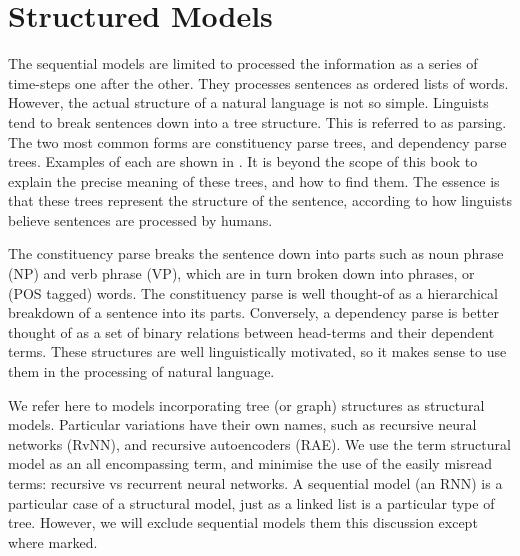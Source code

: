 \documentclass[12pt,parskip]{komatufte}
\begin{document}
\section{Structured Models}


The sequential models are limited to processed the information as a series of time-steps one after the other.
They processes sentences as ordered lists of words.
However, the actual structure of a natural language is not so simple.
Linguists tend to break sentences down into a tree structure.
This is referred to as parsing.
The two most common forms are constituency parse trees, and dependency parse trees.
Examples of each are shown in .
It is beyond the scope of this book to explain the precise meaning of these trees, and how to find them.
The essence is that these trees represent the structure of the sentence,
according to how linguists believe sentences are processed by humans.


The constituency parse breaks the sentence down into parts such as noun phrase (NP) and verb phrase (VP),
which are in turn broken down into phrases, or (POS tagged) words.
The constituency parse is well thought-of as a hierarchical breakdown of a sentence into its parts.
Conversely, a dependency parse is better thought of as a set of binary relations between head-terms and their dependent terms.
These structures are well linguistically motivated, so it makes sense to use them in the processing of natural language.




We refer here to models incorporating tree (or graph) structures as structural models.
Particular variations have their own names, such as recursive neural networks (RvNN), and recursive autoencoders (RAE).
We use the term structural model as an all encompassing term,
and minimise the use of the easily misread terms: recursive vs recurrent  neural networks.
A sequential model  (an RNN) is a particular case of a structural model, just as a linked list is a particular type of tree.
However, we will exclude sequential models them this discussion except where marked.
\end{document}
